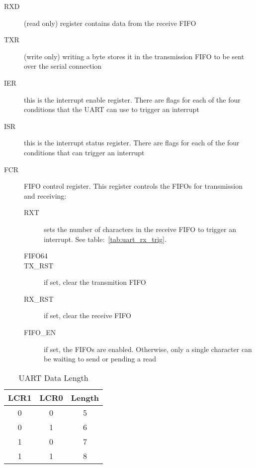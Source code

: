 \begin{description}
    \item[RXD] (read only) register contains data from the receive FIFO

    \item[TXR] (write only) writing a byte stores it in the transmission FIFO to be sent over the serial connection

    \item[IER] this is the interrupt enable register. There are flags for each of the four conditions that the UART can use to trigger an interrupt

    \item[ISR] this is the interrupt status register. There are flags for each of the four conditions that can trigger an interrupt

    \item[FCR] FIFO control register. This register controls the FIFOs for transmission and receiving:
        \begin{description}
            \item[RXT] sets the number of characters in the receive FIFO to trigger an interrupt. See table:~\ref{tab:uart_rx_trig}.

            \item[FIFO64]

            \item[TX\_RST] if set, clear the transmition FIFO

            \item[RX\_RST] if set, clear the receive FIFO

            \item[FIFO\_EN] if set, the FIFOs are enabled. Otherwise, only a single character can be waiting to send or pending a read
        \end{description}
\end{description}

\begin{table}[ht]
    \begin{center}
        \begin{tabular}{|c|c|c|} \hline
            LCR1 & LCR0 & Length \\ \hline\hline
            0 & 0 & 5 \\ \hline
            0 & 1 & 6 \\ \hline
            1 & 0 & 7 \\ \hline
            1 & 1 & 8 \\ \hline
        \end{tabular}
    \end{center}
    \caption{UART Data Length}
    \label{tab:uart_data}
\end{table}


